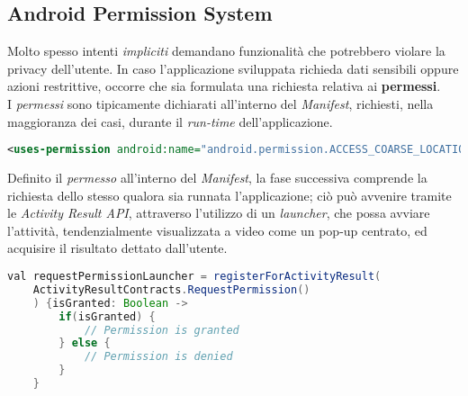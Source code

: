 \documentclass{article}
\begin{document}
\subsection*{Android Permission System}
Molto spesso intenti \textit{impliciti} demandano funzionalità che potrebbero violare la privacy dell'utente. In caso l'applicazione sviluppata richieda dati sensibili oppure azioni restrittive, occorre che sia formulata una richiesta relativa ai \textbf{permessi}.\vspace*{7pt}\\
I \textit{permessi} sono tipicamente dichiarati all'interno del \textit{Manifest}, richiesti, nella maggioranza dei casi, durante il \textit{run-time} dell'applicazione.
\begin{lstlisting}[language=XML]
<uses-permission android:name="android.permission.ACCESS_COARSE_LOCATION" />
\end{lstlisting}
Definito il \textit{permesso} all'interno del \textit{Manifest}, la fase successiva comprende la richiesta dello stesso qualora sia runnata l'applicazione; ciò può avvenire tramite le \textit{Activity Result API}, attraverso l'utilizzo di un \textit{launcher}, che possa avviare l'attività, tendenzialmente visualizzata a video come un pop-up centrato, ed acquisire il risultato dettato dall'utente.
\begin{lstlisting}[language=JAVA]
val requestPermissionLauncher = registerForActivityResult(
    ActivityResultContracts.RequestPermission()
    ) {isGranted: Boolean -> 
        if(isGranted) {
            // Permission is granted
        } else {
            // Permission is denied
        }
    }
\end{lstlisting}
\end{document}
